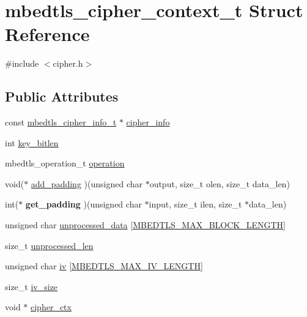 \hypertarget{structmbedtls__cipher__context__t}{\section{mbedtls\-\_\-cipher\-\_\-context\-\_\-t Struct Reference}
\label{structmbedtls__cipher__context__t}
}


{\ttfamily \#include $<$cipher.\-h$>$}

\subsection*{Public Attributes}
\begin{DoxyCompactItemize}
\item 
const \hyperlink{structmbedtls__cipher__info__t}{mbedtls\-\_\-cipher\-\_\-info\-\_\-t} $\ast$ \hyperlink{structmbedtls__cipher__context__t_a7673da39ff63a88c9b85769048884dae}{cipher\-\_\-info}
\item 
int \hyperlink{structmbedtls__cipher__context__t_ac949d799444e6379acf0125891c04763}{key\-\_\-bitlen}
\item 
mbedtls\-\_\-operation\-\_\-t \hyperlink{structmbedtls__cipher__context__t_a0075f60f220daa87578223a2022ba405}{operation}
\item 
void($\ast$ \hyperlink{structmbedtls__cipher__context__t_a74bf13046088d8a575d0920f20178a8a}{add\-\_\-padding} )(unsigned char $\ast$output, size\-\_\-t olen, size\-\_\-t data\-\_\-len)
\item 
\hypertarget{structmbedtls__cipher__context__t_a23bc3805e705599cff8754567a056076}{int($\ast$ {\bfseries get\-\_\-padding} )(unsigned char $\ast$input, size\-\_\-t ilen, size\-\_\-t $\ast$data\-\_\-len)}\label{structmbedtls__cipher__context__t_a23bc3805e705599cff8754567a056076}

\item 
unsigned char \hyperlink{structmbedtls__cipher__context__t_a3fc86dfa20e0131377692ee07fb5b8f0}{unprocessed\-\_\-data} \mbox{[}\hyperlink{cipher_8h_ab8f30dc90403204515f868c3b6196ffd}{M\-B\-E\-D\-T\-L\-S\-\_\-\-M\-A\-X\-\_\-\-B\-L\-O\-C\-K\-\_\-\-L\-E\-N\-G\-T\-H}\mbox{]}
\item 
size\-\_\-t \hyperlink{structmbedtls__cipher__context__t_ad9bb94ad0e914bdceb20190cfebfc702}{unprocessed\-\_\-len}
\item 
unsigned char \hyperlink{structmbedtls__cipher__context__t_a19262f2c275b31180e7412f4bcef0e7f}{iv} \mbox{[}\hyperlink{cipher_8h_aec294721b811aa0f7dcc940029fd8aab}{M\-B\-E\-D\-T\-L\-S\-\_\-\-M\-A\-X\-\_\-\-I\-V\-\_\-\-L\-E\-N\-G\-T\-H}\mbox{]}
\item 
size\-\_\-t \hyperlink{structmbedtls__cipher__context__t_af11d1d21da68ef00a46d96d9de326206}{iv\-\_\-size}
\item 
void $\ast$ \hyperlink{structmbedtls__cipher__context__t_a5b7e2044b5186a4ee57456f6f927ad80}{cipher\-\_\-ctx}
\end{DoxyCompactItemize}


